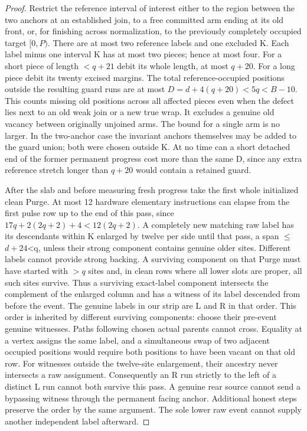 \begin{proof}
Restrict the reference interval of interest either to the region between the two anchors at an established join, to a free committed arm ending at its old front, or, for finishing across normalization, to the previously completely occupied target \([0,P)\). There are at most two reference labels and one excluded K. Each label minus one interval K has at most two pieces; hence at most four. For a short piece of length \(<q+21\) debit its whole length, at most \(q+20\). For a long piece debit its twenty excised margins. The total reference-occupied positions outside the resulting guard runs are at most \(D=d+4(q+20)<5q<B- 10\). This counts missing old positions across all affected pieces even when the defect lies next to an old weak join or a new true wrap. It excludes a genuine old vacancy between originally unjoined arms. The bound for a single arm is no larger. In the two-anchor case the invariant anchors themselves may be added to the guard union; both were chosen outside K. At no time can a short detached end of the former permanent progress cost more than the same D, since any extra reference stretch longer than \(q+20\) would contain a retained guard.

After the slab and before measuring fresh progress take the first whole initialized clean Purge. At most 12 hardware elementary instructions can elapse from the first pulse row up to the end of this pass, since \(17q+2(2q+2)+4<12(2q+2)\). A completely new matching raw label has its descendants within K enlarged by twelve per side until that pass, a span \(\le\)\(d+24\)\textless{}q, unless their strong component contains genuine older sites. Different labels cannot provide strong backing. A surviving component on that Purge must have started with \(>q\) sites and, in clean rows where all lower slots are proper, all such sites survive. Thus a surviving exact-label component intersects the complement of the enlarged column and has a witness of its label descended from before the event. The genuine labels in our strip are L and R in that order. This order is inherited by different surviving components: choose their pre-event genuine witnesses. Paths following chosen actual parents cannot cross. Equality at a vertex assigns the same label, and a simultaneous swap of two adjacent occupied positions would require both positions to have been vacant on that old row. For witnesses outside the twelve-site enlargement, their ancestry never intersects a raw assignment. Consequently an R run strictly to the left of a distinct L run cannot both survive this pass. A genuine rear source cannot send a bypassing witness through the permanent facing anchor. Additional honest steps preserve the order by the same argument. The sole lower raw event cannot supply another independent label afterward.


\end{proof}
